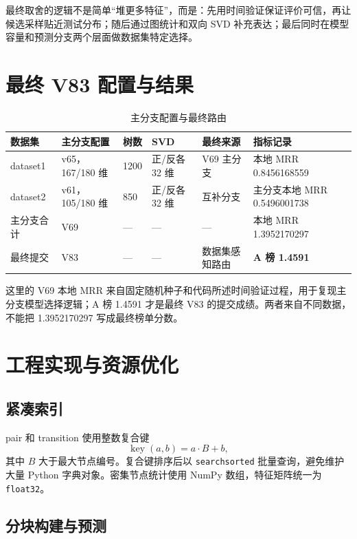 \documentclass[UTF8,a4paper,11pt]{ctexart}
\begin{document}
最终取舍的逻辑不是简单“堆更多特征”，而是：先用时间验证保证评价可信，再让候选采样贴近测试分布；随后通过图统计和双向 SVD 补充表达；最后同时在模型容量和预测分支两个层面做数据集特定选择。

\section{最终 V83 配置与结果}

\begin{table}[htbp]
\centering
\caption{主分支配置与最终路由}
\label{tab:final}
\begin{tabularx}{\textwidth}{lC{2.0cm}C{1.55cm}C{1.7cm}C{1.7cm}Y}
\toprule
数据集 & 主分支配置 & 树数 & SVD & 最终来源 & 指标记录 \\
\midrule
dataset1 & v65，167/180 维 & 1200 & 正/反各 32 维 & V69 主分支 & 本地 MRR 0.8456168559 \\
dataset2 & v61，105/180 维 & 850 & 正/反各 32 维 & 互补分支 & 主分支本地 MRR 0.5496001738 \\
主分支合计 & V69 & --- & --- & --- & 本地 MRR 1.3952170297 \\
最终提交 & V83 & --- & --- & 数据集感知路由 & \textbf{A 榜 1.4591} \\
\bottomrule
\end{tabularx}
\end{table}

这里的 V69 本地 MRR 来自固定随机种子和代码所述时间验证过程，用于复现主分支模型选择逻辑；A 榜 1.4591 才是最终 V83 的提交成绩。两者来自不同数据，不能把 1.3952170297 写成最终榜单分数。

\section{工程实现与资源优化}

\subsection{紧凑索引}

pair 和 transition 使用整数复合键
\[
\operatorname{key}(a,b)=a\cdot B+b,
\]
其中 $B$ 大于最大节点编号。复合键排序后以 \texttt{searchsorted} 批量查询，避免维护大量 Python 字典对象。密集节点统计使用 NumPy 数组，特征矩阵统一为 \texttt{float32}。

\subsection{分块构建与预测}
\end{document}
